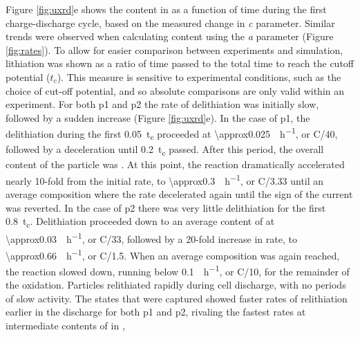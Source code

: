 \documentclass{article}
\begin{document}
Figure \ref{fig:uxrd}e shows the  content in  as a
function of time during the first charge-discharge cycle, based on the
measured change in \emph{c} parameter. Similar trends were observed
when calculating  content using the \emph{a} parameter (Figure
\ref{fig:rates}). To allow for easier comparison between experiments
and simulation, lithiation was shown as a ratio of time passed to the
total time to reach the cutoff potential ($t_c$). This measure is
sensitive to experimental conditions, such as the choice of cut-off
potential, and so absolute comparisons are only valid within an
experiment. For both \gls{p1} and \gls{p2} the rate of delithiation
was initially slow, followed by a sudden increase (Figure
\ref{fig:uxrd}e). In the case of \gls{p1}, the delithiation during the
first \SI{0.05}{t_c} proceeded at \SI{\approx0.025}{\per\hour},
or C/40, followed by a deceleration until \SI{0.2}{t_c} passed. After
this period, the overall content of the particle was
. At this point, the
reaction dramatically accelerated nearly 10-fold from the initial
rate, to \SI{\approx0.3}{\per\hour}, or C/3.33 until an average
composition  where the rate decelerated again until the sign
of the current was reverted. In the case of \gls{p2} there was very
little delithiation for the first \SI{0.8}{t_c}. Delithiation
proceeded down to an average content of  at
\SI{\approx0.03}{\per\hour}, or C/33, followed by a 20-fold
increase in rate, to \SI{\approx0.66}{\per\hour}, or
C/1.5. When an average composition  was again reached, the
reaction slowed down, running below \SI{0.1}{\per\hour}, or
C/10, for the remainder of the oxidation. Particles relithiated
rapidly during cell discharge, with no periods of slow activity. The
states that were captured showed faster rates of relithiation earlier
in the discharge for both \gls{p1} and \gls{p2}, rivaling the fastest
rates at intermediate contents of  in , 

\end{document}

